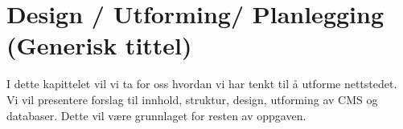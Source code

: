 \cleardoublepage
\chapter{Design / Utforming/ Planlegging (Generisk tittel)}
\label{chap:design} 









I dette kapittelet vil vi ta for oss hvordan vi har tenkt til å utforme nettstedet. Vi vil presentere forslag til innhold, struktur, design, utforming av CMS og databaser. Dette vil være grunnlaget for resten av oppgaven.

